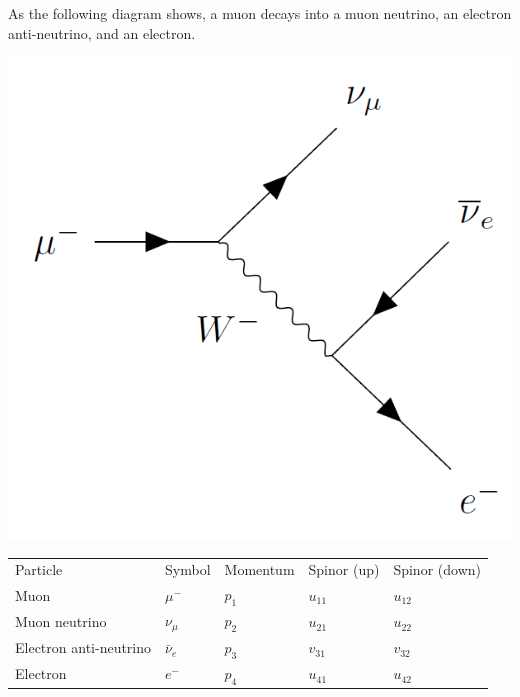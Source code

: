 \documentclass[12pt]{article}
\begin{document}
\noindent
As the following diagram shows, a muon decays into a muon neutrino, an electron anti-neutrino,
and an electron.
\begin{center}
\includegraphics[scale=0.25]{muon-decay-diagram.png}
\end{center}

\begin{center}
\begin{tabular}{lllll}
Particle & Symbol & Momentum & Spinor (up) & Spinor (down)
\\[2ex]
Muon & $\mu^-$ & $p_1$ & $u_{11}$ & $u_{12}$
\\
Muon neutrino & $\nu_\mu$ & $p_2$ & $u_{21}$ & $u_{22}$
\\
Electron anti-neutrino & $\bar{\nu}_e$ & $p_3$ & $v_{31}$ & $v_{32}$
\\
Electron & $e^-$ & $p_4$ & $u_{41}$ & $u_{42}$
\end{tabular}
\end{center}
\end{document}
